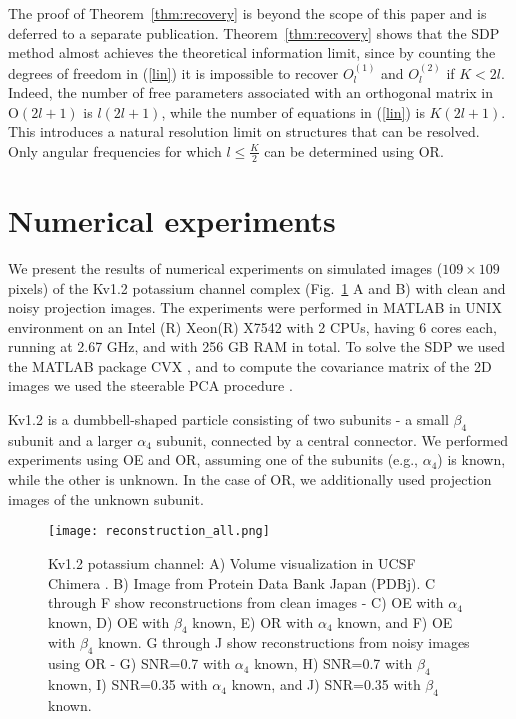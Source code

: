 \documentclass{article}
\begin{document}
The proof of Theorem~\ref{thm:recovery} is beyond the scope of this paper and is deferred to a separate publication. Theorem~\ref{thm:recovery} shows that the SDP method almost achieves the theoretical information limit, since by counting the degrees of freedom in (\ref{lin}) it is impossible to recover $O_l^{(1)}$ and $O_l^{(2)}$ if $K< 2l$. Indeed, the number of free parameters associated with an orthogonal matrix in
$\text{O}(2l+1)$ is $l(2l+1)$, while the number of equations in (\ref{lin}) is $K(2l+1)$. This introduces a natural resolution limit on structures that can be resolved. Only angular frequencies for which $l \leq \frac{K}{2}$ can be determined using OR.

\section{Numerical experiments}

We present the results of numerical experiments on simulated images ($109\times 109$ pixels) of the Kv1.2 potassium
channel complex (Fig.~\ref{fig:truth} A and B) with clean and noisy
projection images. The experiments were performed in MATLAB in UNIX environment on an
Intel (R) Xeon(R) X7542 with 2 CPUs, having 6 cores each, running at 2.67 GHz, and with
256 GB RAM in total. To solve the SDP we used the MATLAB package CVX \cite{cvx}, and to compute the covariance matrix of the 2D images we used the steerable PCA procedure \cite{Zhao1}.

Kv1.2 is a dumbbell-shaped particle consisting of two subunits - a small $\beta_4$ subunit
and a larger $\alpha_4$ subunit, connected by a central connector. We performed
experiments using OE and OR, assuming one of the subunits (e.g., $\alpha_4$) is known,
while the other is unknown. In the case of OR, we additionally used projection
images of the unknown subunit.

\begin{figure}
\begin{center}
\texttt{[image: reconstruction\_all.png]}
\end{center}
\vspace{-.1in}
\caption{Kv1.2 potassium channel: A) Volume visualization in UCSF Chimera \cite{chimera}. B) Image from Protein Data Bank Japan (PDBj). C through F show reconstructions from clean images - C) OE with $\alpha_4$ known, D) OE with $\beta_4$ known, E) OR with $\alpha_4$ known, and F) OE with $\beta_4$ known. G through J show reconstructions from noisy images using OR - G) SNR=0.7 with $\alpha_4$ known, H) SNR=0.7 with $\beta_4$ known, I) SNR=0.35 with $\alpha_4$ known, and J) SNR=0.35 with $\beta_4$ known.}
\label{fig:truth}
\end{figure}
\end{document}
